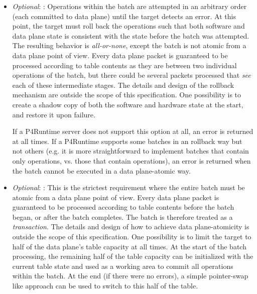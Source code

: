 \documentclass[11pt]{article}
\begin{document}
{\begin{itemize}
\item{}
\emph{Optional}: : Operations within the batch are attempted in
an arbitrary order (each committed to data plane) until the target detects an
error. At this point, the target must roll back the operations such that both
software and data plane state is consistent with the state before the batch
was attempted. The resulting behavior is \emph{all-or-none}, except the batch is
not atomic from a data plane point of view. Every data plane packet is
guaranteed to be processed according to table contents as they are between two
individual operations of the batch, but there could be several packets
processed that \emph{see} each of these intermediate stages. The details and design
of the rollback mechanism are outside the scope of this specification. One
possibility is to create a shadow copy of both the software and hardware state
at the start, and restore it upon failure.%

If a P4Runtime server does not support this option at all, an
 error is returned at all times. If a P4Runtime
supports some batches in an rollback way but not others (e.g. it is
more straightforward to implement batches that contain only 
operations, vs. those that contain  operations), an
 error is returned when the batch cannot be executed
in a data plane-atomic way.%

\item{}
\emph{Optional}: : This is the strictest requirement where the
entire batch must be atomic from a data plane point of view. Every data plane
packet is guaranteed to be processed according to table contents before the
batch began, or after the batch completes. The batch is therefore treated as a
\emph{transaction}. The details and design of how to achieve data plane-atomicity is
outside the scope of this specification. One possibility is to limit the
target to half of the data plane's table capacity at all times. At the start
of the batch processing, the remaining half of the table capacity can be
initialized with the current table state and used as a working area to commit
all operations within the batch. At the end (if there were no errors), a
simple pointer-swap like approach can be used to switch to this half of the
table.%


\end{itemize}}
\end{document}
